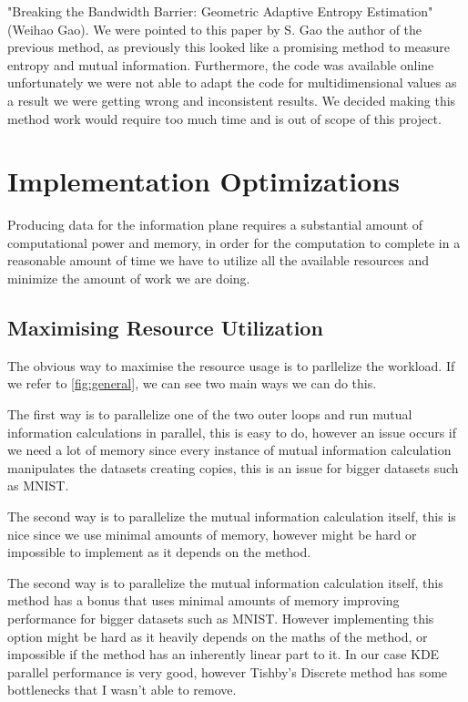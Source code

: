 \documentclass[dissertation.tex]{subfiles}
\begin{document}
  "Breaking the Bandwidth Barrier: Geometric Adaptive Entropy Estimation"
  (Weihao Gao). We were pointed to this paper by S. Gao the author of the
  previous method, as previously this looked like a promising method to measure
  entropy and mutual information. Furthermore, the code was available online
  unfortunately we were not able to adapt the code for multidimensional values
  as a result we were getting wrong and inconsistent results. We decided making
  this method work would require too much time and is out of scope of this
  project.

\section{Implementation Optimizations}

Producing data for the information plane requires a substantial amount of
computational power and memory, in order for the computation to complete in a
reasonable amount of time we have to utilize all the available resources and
minimize the amount of work we are doing.

\subsection{Maximising Resource Utilization}

The obvious way to maximise the resource usage is to parllelize the workload.
If we refer to \autoref{fig:general}, we can see two main ways we can do this.

The first way is to parallelize one of the two outer loops and run mutual
information calculations in parallel, this is easy to do, however an issue
occurs if we need a lot of memory since every instance of mutual information
calculation manipulates the datasets creating copies, this is an issue for
bigger datasets such as MNIST.

The second way is to parallelize the mutual information calculation itself, this
is nice since we use minimal amounts of memory, however might be hard or
impossible to implement as it depends on the method.

The second way is to parallelize the mutual information calculation itself, this
method has a  bonus that uses minimal amounts of memory improving performance
for bigger datasets such as MNIST. However implementing this option might be
hard as it heavily depends on the maths of the method, or impossible if the
method has an inherently linear part to it. In our case KDE parallel performance
is very good, however Tishby's Discrete method has some bottlenecks that I
wasn't able to remove.
\end{document}
